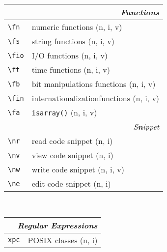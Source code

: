 \documentclass[oneside,10pt,landscape,DIV16]{scrartcl}
\begin{document}
\begin{multicols}{3}
\begin{center}
\begin{tabular}[]{|p{11mm}|p{60mm}|}
\hline
\multicolumn{2}{|r|}{\textsl{\textbf{F}unctions}}              \\[1.0ex]
\hline \verb'\fn ' & numeric functions                       \hfill (n, i, v)\\
\hline \verb'\fs ' & string functions                        \hfill (n, i, v)\\
\hline \verb'\fio' & I/O functions                           \hfill (n, i, v)\\
\hline \verb'\ft ' & time functions                          \hfill (n, i, v)\\
\hline \verb'\fb ' & bit manipulations functions             \hfill (n, i, v)\\
\hline \verb'\fin' & internationalizationfunctions           \hfill (n, i, v)\\
\hline \verb'\fa ' & \texttt{isarray()}                      \hfill (n, i, v)\\
\hline
\hline
\multicolumn{2}{|r|}{\textsl{S\textbf{n}ippet}}                \\[1.0ex]
\hline \verb'\nr'  & read code snippet         \hfill (n, i)   \\
\hline \verb'\nv'  & view code snippet         \hfill (n, i)   \\
\hline \verb'\nw'  & write code snippet        \hfill (n, i, v)\\
\hline \verb'\ne'  & edit code snippet         \hfill (n, i)   \\
\hline
%
\end{tabular}\\
%
%
\begin{tabular}[]{|p{11mm}|p{62mm}|}
\hline
\multicolumn{2}{|r|}{\textsl{Regular E\textbf{x}pressions}}     \\[1.0ex]
\hline     \verb'xpc' &  POSIX classes                 \hfill (n, i)\\ 

\end{tabular}
\end{center}
\end{multicols}
\end{document}
